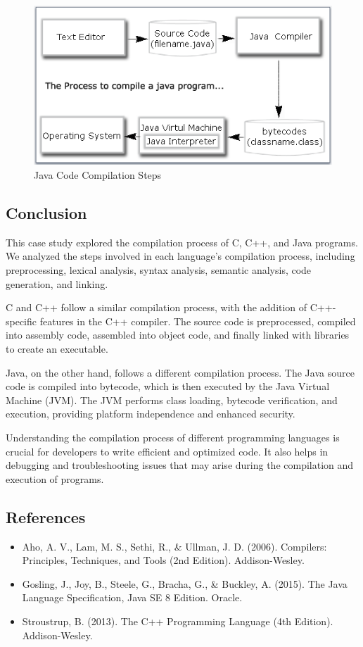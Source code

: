 \documentclass[12pt]{article}
\begin{document}
\begin{figure}[H]
    \centering
    \includegraphics[width=0.7\linewidth]{java.png}
    \caption{Java Code Compilation Steps}
\end{figure}

\subsection*{Conclusion}
This case study explored the compilation process of C, C++, and Java programs. We analyzed the steps involved in each language's compilation process, including preprocessing, lexical analysis, syntax analysis, semantic analysis, code generation, and linking.

C and C++ follow a similar compilation process, with the addition of C++-specific features in the C++ compiler. The source code is preprocessed, compiled into assembly code, assembled into object code, and finally linked with libraries to create an executable.

Java, on the other hand, follows a different compilation process. The Java source code is compiled into bytecode, which is then executed by the Java Virtual Machine (JVM). The JVM performs class loading, bytecode verification, and execution, providing platform independence and enhanced security.

Understanding the compilation process of different programming languages is crucial for developers to write efficient and optimized code. It also helps in debugging and troubleshooting issues that may arise during the compilation and execution of programs.

\subsection*{References}
\begin{itemize}
    \item Aho, A. V., Lam, M. S., Sethi, R., \& Ullman, J. D. (2006). Compilers: Principles, Techniques, and Tools (2nd Edition). Addison-Wesley.
    \item Gosling, J., Joy, B., Steele, G., Bracha, G., \& Buckley, A. (2015). The Java Language Specification, Java SE 8 Edition. Oracle.
    \item Stroustrup, B. (2013). The C++ Programming Language (4th Edition). Addison-Wesley.
\end{itemize}
\end{document}
